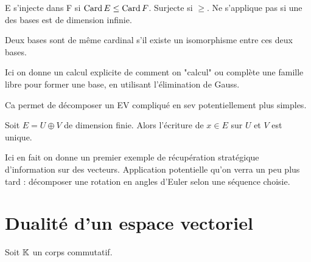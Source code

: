 \begin{definition}[Isomorphisme]
\end{definition}

\begin{definition}[Automorphisme]
\end{definition}

\begin{proposition}
	E s'injecte dans F si $\operatorname*{Card} E \leq \operatorname*{Card} F$.
	Surjecte si $\geq$.
	Ne s'applique pas si une des bases est de dimension infinie.
\end{proposition}

\begin{theorem}
	Deux bases sont de même cardinal s'il existe un isomorphisme entre ces deux bases.
\end{theorem}

\begin{example}
	Ici on donne un calcul explicite de comment on "calcul" ou complète une famille libre
	pour former une base, en utilisant l'élimination de Gauss.
\end{example}

\begin{definition}[s.e.v. supplémentaires]
\end{definition}

\begin{remark}
	Ca permet de décomposer un EV compliqué en sev potentiellement plus simples.
\end{remark}

\begin{proposition}
	Soit $E = U \oplus V$ de dimension finie.
	Alors l'écriture de $x\in E$ sur $U$ et $V$ est unique.
\end{proposition}

\begin{remark}
	Ici en fait on donne un premier exemple de récupération stratégique d'information
	sur des vecteurs. Application potentielle qu'on verra un peu plus tard : 
	décomposer une rotation en angles d'Euler selon une séquence choisie.
\end{remark}


\section{Dualité d'un espace vectoriel}
Soit $\operatorname{\mathbb{K}}$ un corps commutatif.

